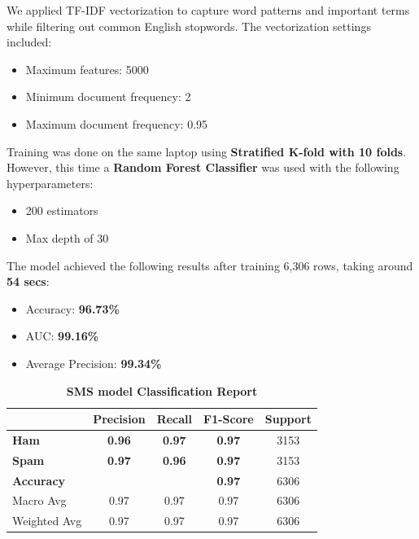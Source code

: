 \documentclass{article}
\begin{document}
We applied TF-IDF vectorization to capture word patterns and important terms while filtering out common English stopwords. The vectorization settings included:
\begin{itemize}
    \item Maximum features: 5000
    \item Minimum document frequency: 2
    \item Maximum document frequency: 0.95
\end{itemize}

\noindent
Training was done on the same laptop using \textbf{Stratified K-fold with 10 folds}. However, this time a \textbf{Random Forest Classifier} was used with the following hyperparameters:

\begin{itemize}
    \item 200 estimators
    \item Max depth of 30
\end{itemize}

\noindent
The model achieved the following results after training 6,306 rows, taking around \textbf{54 secs}:

\begin{itemize}
    \item Accuracy: \textbf{96.73\%}
    \item AUC: \textbf{99.16\%}
    \item Average Precision: \textbf{99.34\%}
\end{itemize}

\begin{table}[htbp]
    \centering
    \caption{\textbf{SMS model Classification Report}}
    \begin{tabular}{l c c c c}
    \toprule
     & \textbf{Precision} & \textbf{Recall} & \textbf{F1-Score} & Support \\
    \midrule
    \textbf{Ham} & \textbf{0.96} & \textbf{0.97} & \textbf{0.97} & 3153 \\
    \textbf{Spam} & \textbf{0.97} & \textbf{0.96} & \textbf{0.97} & 3153 \\
    \midrule
    \textbf{Accuracy} & & & \textbf{0.97} & 6306 \\
    Macro Avg & 0.97 & 0.97 & 0.97 & 6306 \\
    Weighted Avg & 0.97 & 0.97 & 0.97 & 6306 \\
    \bottomrule
    \end{tabular}
    \label{tab:classification_report_2}
\end{table}
\end{document}
